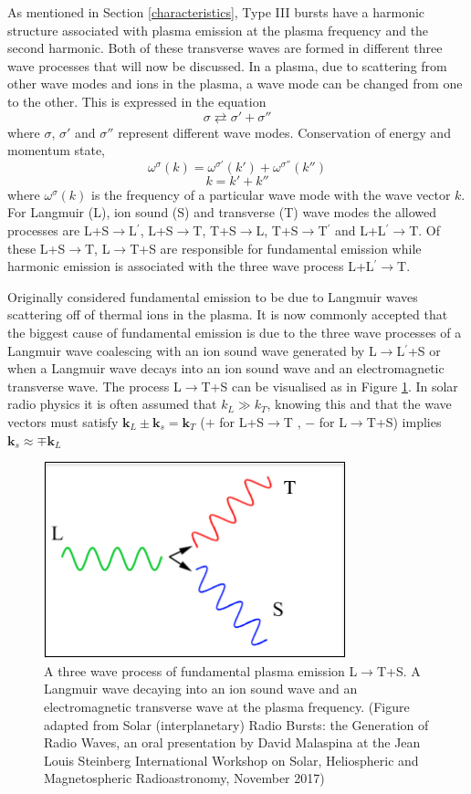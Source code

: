 As mentioned in Section \ref{characteristics}, Type III bursts have a harmonic structure associated with plasma emission at the plasma frequency and the second harmonic. Both of these transverse waves are formed in different three wave processes that will now be discussed.
In a plasma, due to scattering from other wave modes and ions in the plasma, a wave mode can be changed from one to the other. This is expressed in the equation 
$$ \sigma \rightleftarrows \sigma' + \sigma '' $$
where $\sigma$, $\sigma'$  and  $\sigma ''$ represent different wave modes. Conservation of energy and momentum state,
$$ \omega^{\sigma}(k)=\omega^{\sigma'}(k')+\omega^{\sigma''}(k'')$$
$$ k=k'+k''$$
where $ \omega^{\sigma}(k)$ is the frequency of a particular wave mode with the wave vector $k$. For Langmuir (L), ion sound (S) and transverse (T) wave modes the allowed processes are L+S$\rightarrow$L$^\prime$, L+S$\rightarrow$T,  T+S$\rightarrow$L,  T+S$\rightarrow$T$^\prime$ and  L+L$^\prime \rightarrow$T. Of these L+S$\rightarrow$T,  L$\rightarrow$T+S are responsible for fundamental emission while harmonic emission is associated with the three wave process L+L$^\prime \rightarrow$T.

Originally \cite{Ginzburg1958} considered fundamental emission to be due to Langmuir waves scattering off of thermal ions in the plasma. It is now commonly accepted that the biggest cause of fundamental emission is due to the three wave processes of a Langmuir wave coalescing with an ion sound wave generated by L$\rightarrow$L$^\prime$+S or when a Langmuir wave decays into an ion sound wave and an electromagnetic transverse wave. The process L$\rightarrow$T+S can be visualised as in Figure \ref{fig:Femission}. In solar radio physics it is often assumed that $k_L \gg k_T$, knowing this and that the wave vectors must satisfy $\mathbf{k}_L \pm \mathbf{k}_s = \mathbf{k}_T$ ($+$ for L+S$\rightarrow$T , $-$ for L$\rightarrow$T+S) implies $\mathbf{k}_s \approx \mp \mathbf{k}_L$ 

\begin{figure}
\centering
\includegraphics[width=0.5\columnwidth]{Images/Fundamental_emission_Lwaves.png}
\caption[A three wave process of fundamental plasma emission L$\rightarrow$T+S]{A three wave process of fundamental plasma emission L$\rightarrow$T+S. A Langmuir wave decaying into an ion sound wave and an electromagnetic transverse wave at the plasma frequency. (Figure adapted from Solar (interplanetary) Radio Bursts: the Generation of Radio Waves,	an oral presentation by David Malaspina at the Jean Louis Steinberg International Workshop on Solar, Heliospheric and Magnetospheric Radioastronomy, November 2017)}
\label{fig:Femission}
\end{figure}

